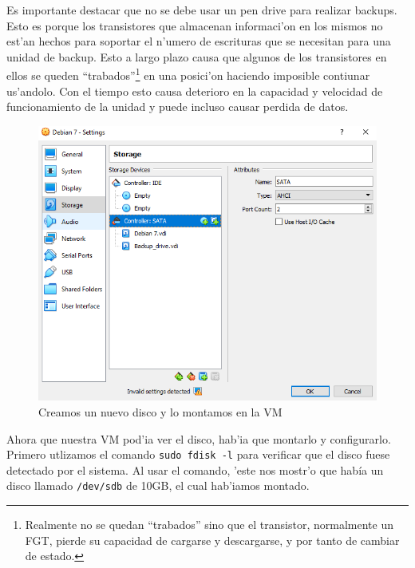 \documentclass[11pt]{article}
\begin{document}
		Es importante destacar que no se debe usar un pen drive para realizar backups. Esto es porque los transistores que almacenan informaci'on en los mismos no est'an hechos para soportar el n'umero de escrituras que se necesitan para una unidad de backup. Esto a largo plazo causa que algunos de los transistores en ellos se queden ``trabados''\footnote{Realmente no se quedan ``trabados'' sino que el transistor, normalmente un FGT, pierde su capacidad de cargarse y descargarse, y por tanto de cambiar de estado.} en una posici'on haciendo imposible contiunar us'andolo. Con el tiempo esto causa deterioro en la capacidad y velocidad de funcionamiento de la unidad y puede incluso causar perdida de datos.

		\begin{figure}[H]
    			\centering \captionsetup{justification=centering}
    			\includegraphics[scale=0.65]{Images/rsync/rsync_hdd_config.PNG}
    			\caption{Creamos un nuevo disco y lo montamos en la VM}
    			\label{fig:rsync_hdd_config}
		\end{figure}

		Ahora que nuestra VM pod'ia ver el disco, hab'ia que montarlo y configurarlo. Primero utlizamos el comando \texttt{sudo fdisk -l} para verificar que el disco fuese detectado por el sistema. Al usar el comando, 'este nos mostr'o que había un disco llamado \texttt{/dev/sdb} de 10GB, el cual hab'iamos montado.
\end{document}
